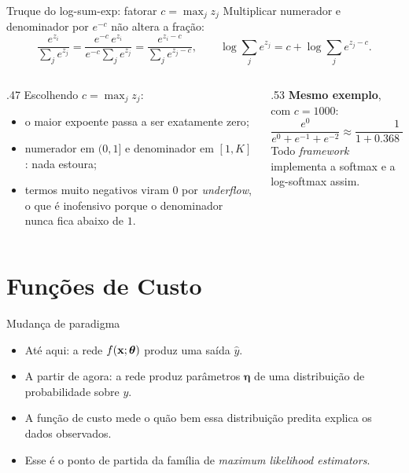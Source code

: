 \documentclass[aspectratio=169,xcolor=dvipsnames]{beamer}
\begin{document}
  \begin{frame}{Truque do log-sum-exp: fatorar $c = \max_j z_j$}
    Multiplicar numerador e denominador por $e^{-c}$ não altera a fração:
    \[
      \frac{e^{z_i}}{\sum_{j} e^{z_j}}
      = \frac{e^{-c}\,e^{z_i}}{e^{-c}\sum_{j} e^{z_j}}
      = \frac{e^{z_i - c}}{\sum_{j} e^{z_j - c}},
      \qquad
      \log\sum_{j} e^{z_j} = c + \log\sum_{j} e^{z_j - c}.
    \]
    \begin{columns}[T]
      \begin{column}{.47\linewidth}
        Escolhendo $c = \max_j z_j$:
        \begin{itemize}
          \item o maior expoente passa a ser \alert{exatamente zero};
          \item numerador em $(0,1]$ e denominador em $[1,K]$: nada estoura;
          \item termos muito negativos viram $0$ por \textit{underflow}, o que é
            inofensivo porque o denominador nunca fica abaixo de $1$.
        \end{itemize}
      \end{column}
      \begin{column}{.53\linewidth}
        \centering
        \textbf{Mesmo exemplo}, com $c = 1000$:
        \[
          \frac{e^{0}}{e^{0}+e^{-1}+e^{-2}}
          \approx \frac{1}{1 + 0.368 + 0.135}
          \approx 0.665
        \]
        {\footnotesize Todo \textit{framework} implementa a softmax e a log-softmax assim.}
      \end{column}
    \end{columns}
  \end{frame}

  \section{Funções de Custo}

  \begin{frame}{Mudança de paradigma}
    \begin{itemize}
      \item Até aqui: a rede $f(\mathbf{x};\bm{\theta})$ produz uma saída $\hat y$.
      \item A partir de agora: a rede produz \alert{parâmetros $\bm{\eta}$ de uma distribuição
        de probabilidade} sobre $y$.
      \item A função de custo mede o quão bem essa distribuição predita explica os dados observados.
      \item Esse é o ponto de partida da família de \textit{maximum likelihood estimators}.
    \end{itemize}
  \end{frame}
\end{document}
